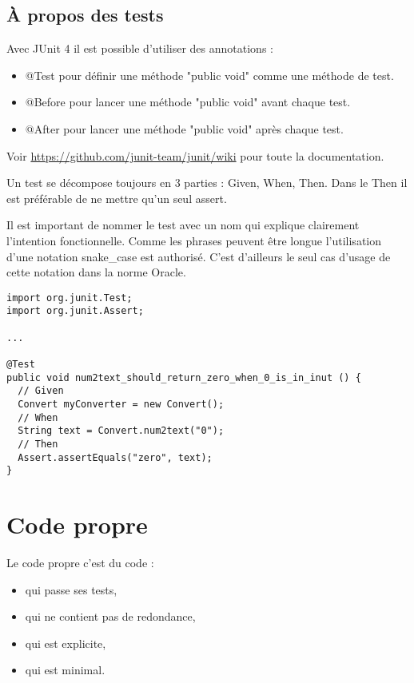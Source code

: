 \documentclass[a4paper]{article}
\begin{document}
\begin{center}
\end{center}

\subsection*{À propos des tests}
Avec JUnit 4 il est possible d'utiliser des annotations : 
\begin{itemize}
  \item @Test pour définir une méthode "public void" comme une méthode de test.
  \item @Before pour lancer une méthode "public void" avant chaque test.
  \item @After pour lancer une méthode "public void" après chaque test.
\end{itemize}
Voir \url{https://github.com/junit-team/junit/wiki} pour toute la documentation.

Un test se décompose toujours en 3 parties : Given, When, Then. Dans le Then il est préférable de ne mettre qu'un seul assert.

Il est important de nommer le test avec un nom qui explique clairement l'intention fonctionnelle. Comme les phrases peuvent être longue l'utilisation d'une notation snake\_case est authorisé. C'est d'ailleurs le seul cas d'usage de cette notation dans la norme Oracle.

\begin{verbatim}
import org.junit.Test;
import org.junit.Assert;

...

@Test
public void num2text_should_return_zero_when_0_is_in_inut () {
  // Given
  Convert myConverter = new Convert();
  // When
  String text = Convert.num2text("0");
  // Then
  Assert.assertEquals("zero", text);
}
\end{verbatim}

\section*{Code propre}

Le code propre c’est du code :
\begin{itemize}
\item qui passe ses tests,
\item qui ne contient pas de redondance,
\item qui est explicite,
\item qui est minimal.
\end{itemize}
\end{document}
